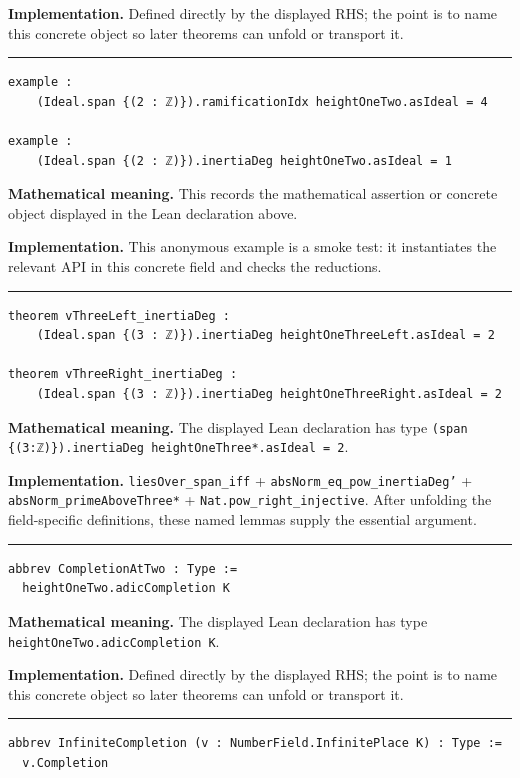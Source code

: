 \documentclass[UTF8,a4paper,11pt,fontset=fandol]{ctexart}
\theoremstyle{definition}
\newcommand{\statementsep}{\par\medskip\hrule\medskip}
\begin{document}
\noindent\textbf{Implementation.} Defined directly by the displayed RHS; the point is to name this concrete object so later theorems can unfold or transport it.\par
\statementsep
\begin{verbatim}
example :
    (Ideal.span {(2 : ℤ)}).ramificationIdx heightOneTwo.asIdeal = 4

example :
    (Ideal.span {(2 : ℤ)}).inertiaDeg heightOneTwo.asIdeal = 1
\end{verbatim}
\noindent\textbf{Mathematical meaning.} This records the mathematical assertion or concrete object displayed in the Lean declaration above.\par
\noindent\textbf{Implementation.} This anonymous example is a smoke test: it instantiates the relevant API in this concrete field and checks the reductions.\par
\statementsep
\begin{verbatim}
theorem vThreeLeft_inertiaDeg :
    (Ideal.span {(3 : ℤ)}).inertiaDeg heightOneThreeLeft.asIdeal = 2

theorem vThreeRight_inertiaDeg :
    (Ideal.span {(3 : ℤ)}).inertiaDeg heightOneThreeRight.asIdeal = 2
\end{verbatim}
\noindent\textbf{Mathematical meaning.} The displayed Lean declaration has type \texttt{(span \{(3:ℤ)\}).\allowbreak{}inertiaDeg heightOneThree*.\allowbreak{}asIdeal = 2}.\par
\noindent\textbf{Implementation.} \texttt{liesOver\_\allowbreak{}span\_\allowbreak{}iff} + \texttt{absNorm\_\allowbreak{}eq\_\allowbreak{}pow\_\allowbreak{}inertiaDeg'} + \texttt{absNorm\_\allowbreak{}primeAboveThree*} + \texttt{Nat.\allowbreak{}pow\_\allowbreak{}right\_\allowbreak{}injective}. After unfolding the field-specific definitions, these named lemmas supply the essential argument.\par
\statementsep
\begin{verbatim}
abbrev CompletionAtTwo : Type :=
  heightOneTwo.adicCompletion K
\end{verbatim}
\noindent\textbf{Mathematical meaning.} The displayed Lean declaration has type \texttt{heightOneTwo.\allowbreak{}adicCompletion K}.\par
\noindent\textbf{Implementation.} Defined directly by the displayed RHS; the point is to name this concrete object so later theorems can unfold or transport it.\par
\statementsep
\begin{verbatim}
abbrev InfiniteCompletion (v : NumberField.InfinitePlace K) : Type :=
  v.Completion
\end{verbatim}
\end{document}
